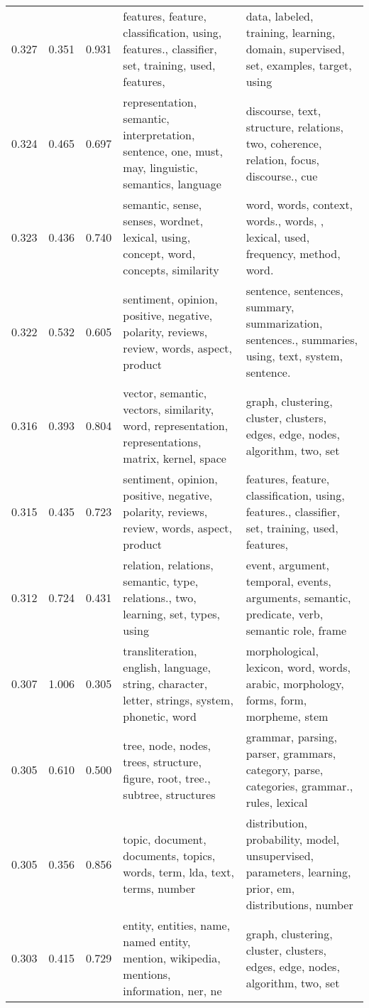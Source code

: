 \begin{tabular}{cccp{5cm}p{5cm}}
0.327 & 0.351 & 0.931 & features, feature, classification, using, features., classifier, set, training, used, features,  & data, labeled, training, learning, domain, supervised, set, examples, target, using \\
0.324 & 0.465 & 0.697 & representation, semantic, interpretation, sentence, one, must, may, linguistic, semantics, language & discourse, text, structure, relations, two, coherence, relation, focus, discourse., cue \\
0.323 & 0.436 & 0.740 & semantic, sense, senses, wordnet, lexical, using, concept, word, concepts, similarity & word, words, context, words., words, , lexical, used, frequency, method, word. \\
0.322 & 0.532 & 0.605 & sentiment, opinion, positive, negative, polarity, reviews, review, words, aspect, product & sentence, sentences, summary, summarization, sentences., summaries, using, text, system, sentence. \\
0.316 & 0.393 & 0.804 & vector, semantic, vectors, similarity, word, representation, representations, matrix, kernel, space & graph, clustering, cluster, clusters, edges, edge, nodes, algorithm, two, set \\
0.315 & 0.435 & 0.723 & sentiment, opinion, positive, negative, polarity, reviews, review, words, aspect, product & features, feature, classification, using, features., classifier, set, training, used, features,  \\
0.312 & 0.724 & 0.431 & relation, relations, semantic, type, relations., two, learning, set, types, using & event, argument, temporal, events, arguments, semantic, predicate, verb, semantic role, frame \\
0.307 & 1.006 & 0.305 & transliteration, english, language, string, character, letter, strings, system, phonetic, word & morphological, lexicon, word, words, arabic, morphology, forms, form, morpheme, stem \\
0.305 & 0.610 & 0.500 & tree, node, nodes, trees, structure, figure, root, tree., subtree, structures & grammar, parsing, parser, grammars, category, parse, categories, grammar., rules, lexical \\
0.305 & 0.356 & 0.856 & topic, document, documents, topics, words, term, lda, text, terms, number & distribution, probability, model, unsupervised, parameters, learning, prior, em, distributions, number \\
0.303 & 0.415 & 0.729 & entity, entities, name, named entity, mention, wikipedia, mentions, information, ner, ne & graph, clustering, cluster, clusters, edges, edge, nodes, algorithm, two, set \\

\end{tabular}
